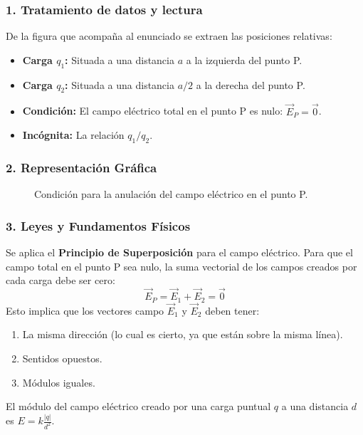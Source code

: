 \subsubsection*{1. Tratamiento de datos y lectura}
De la figura que acompaña al enunciado se extraen las posiciones relativas:
\begin{itemize}
    \item \textbf{Carga $q_1$:} Situada a una distancia $a$ a la izquierda del punto P.
    \item \textbf{Carga $q_2$:} Situada a una distancia $a/2$ a la derecha del punto P.
    \item \textbf{Condición:} El campo eléctrico total en el punto P es nulo: $\vec{E}_P = \vec{0}$.
    \item \textbf{Incógnita:} La relación $q_1/q_2$.
\end{itemize}

\subsubsection*{2. Representación Gráfica}
\begin{figure}[H]
    \centering
    \caption{Condición para la anulación del campo eléctrico en el punto P.}
\end{figure}

\subsubsection*{3. Leyes y Fundamentos Físicos}
Se aplica el \textbf{Principio de Superposición} para el campo eléctrico. Para que el campo total en el punto P sea nulo, la suma vectorial de los campos creados por cada carga debe ser cero:
$$\vec{E}_P = \vec{E}_1 + \vec{E}_2 = \vec{0}$$
Esto implica que los vectores campo $\vec{E}_1$ y $\vec{E}_2$ deben tener:
\begin{enumerate}
    \item La misma dirección (lo cual es cierto, ya que están sobre la misma línea).
    \item Sentidos opuestos.
    \item Módulos iguales.
\end{enumerate}
El módulo del campo eléctrico creado por una carga puntual $q$ a una distancia $d$ es $E = k \frac{|q|}{d^2}$.

